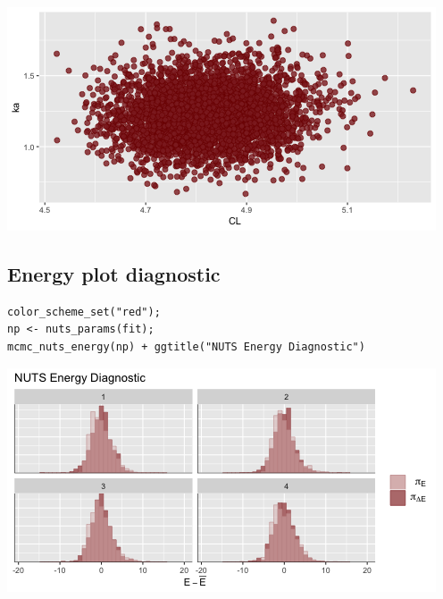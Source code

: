\documentclass[11pt]{article}
\begin{document}
\begin{center}
\includegraphics[width=.9\linewidth]{result/scatter.png}
\end{center}

\subsection{Energy  plot diagnostic}
\label{sec:org84300d8}
\begin{verbatim}
color_scheme_set("red");
np <- nuts_params(fit);
mcmc_nuts_energy(np) + ggtitle("NUTS Energy Diagnostic")
\end{verbatim}

\begin{center}
\includegraphics[width=.9\linewidth]{result/energy.png}
\end{center}
\end{document}
